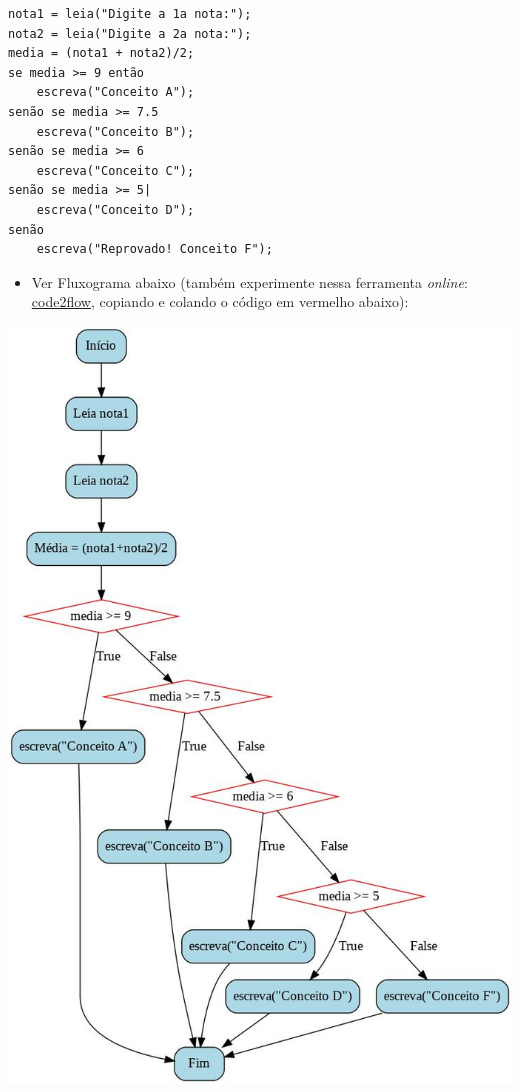 \documentclass[12pt,a4paper]{article}
\providecommand{\tightlist}{%
      \setlength{\itemsep}{0pt}\setlength{\parskip}{0pt}}
\begin{document}
    \begin{verbatim}
nota1 = leia("Digite a 1a nota:");
nota2 = leia("Digite a 2a nota:");
media = (nota1 + nota2)/2;
se media >= 9 então  
    escreva("Conceito A");
senão se media >= 7.5  
    escreva("Conceito B");
senão se media >= 6
    escreva("Conceito C");
senão se media >= 5|
    escreva("Conceito D");
senão
    escreva("Reprovado! Conceito F");
\end{verbatim}

    \begin{itemize}
\tightlist
\item
  Ver Fluxograma abaixo (também experimente nessa ferramenta
  \emph{online}: \href{https://app.code2flow.com/}{code2flow}, copiando
  e colando o código em vermelho abaixo):
\end{itemize}

\includegraphics{"figs/flowchartCap3b.jpg"}
\end{document}
